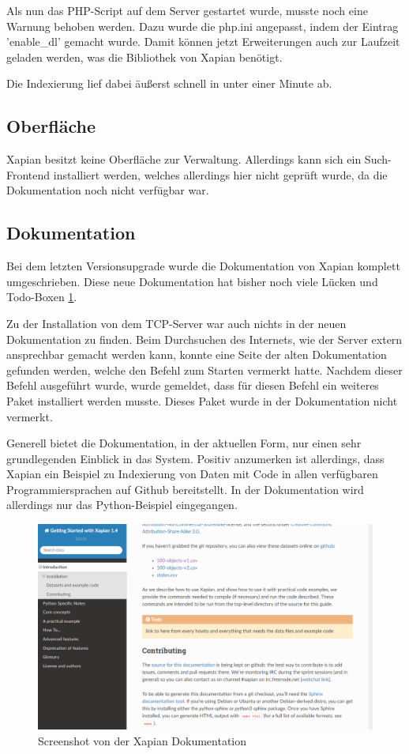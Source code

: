 Als nun das PHP-Script auf dem Server gestartet wurde, musste noch eine Warnung behoben werden. Dazu wurde die php.ini angepasst, indem der Eintrag 'enable\_dl' gemacht wurde. Damit können jetzt Erweiterungen auch zur Laufzeit geladen werden, was die Bibliothek von Xapian benötigt.

Die Indexierung lief dabei äußerst schnell in unter einer Minute ab.

\subsection{Oberfläche}

Xapian besitzt keine Oberfläche zur Verwaltung. Allerdings kann sich ein Such-Frontend installiert werden, welches allerdings hier nicht geprüft wurde, da die Dokumentation noch nicht verfügbar war.

\subsection{Dokumentation}

Bei dem letzten Versionsupgrade wurde die Dokumentation von Xapian komplett umgeschrieben. Diese neue Dokumentation hat bisher noch viele Lücken und Todo-Boxen \ref{img:xapianDoku}.

Zu der Installation von dem TCP-Server war auch nichts in der neuen Dokumentation zu finden. Beim Durchsuchen des Internets, wie der Server extern ansprechbar gemacht werden kann, konnte eine Seite der alten Dokumentation gefunden werden, welche den Befehl zum Starten vermerkt hatte. Nachdem dieser Befehl ausgeführt wurde, wurde gemeldet, dass für diesen Befehl ein weiteres Paket installiert werden musste. Dieses Paket wurde in der Dokumentation nicht vermerkt. 

Generell bietet die Dokumentation, in der aktuellen Form, nur einen sehr grundlegenden Einblick in das System. Positiv anzumerken ist allerdings, dass Xapian ein Beispiel zu Indexierung von Daten mit Code in allen verfügbaren Programmiersprachen auf Github bereitstellt. In der Dokumentation wird allerdings nur das Python-Beispiel eingegangen.

\begin{figure}
	\centering
	\includegraphics[width=1\linewidth]{images/xapian_doku.png}
	\caption{Screenshot von der Xapian Dokumentation}
	\label{img:xapianDoku}
\end{figure}

